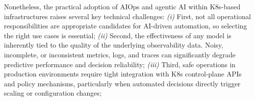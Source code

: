 \documentclass[sigconf]{acmart}
\begin{document}
Nonetheless, the practical adoption of AIOps and agentic AI within K8s-based infrastructures raises several key technical challenges: 
\textit{(i)} First, not all operational responsibilities are appropriate candidates for AI-driven automation, so selecting the right use cases is essential;
\textit{(ii)} Second, the effectiveness of any model is inherently tied to the quality of the underlying observability data. Noisy, incomplete, or inconsistent metrics, logs, and traces can significantly degrade predictive performance and decision reliability;
\textit{(iii)} Third, safe operations in production environments require tight integration with K8s control-plane APIs and policy mechanisms, particularly when automated decisions directly trigger scaling or configuration changes;
\end{document}
